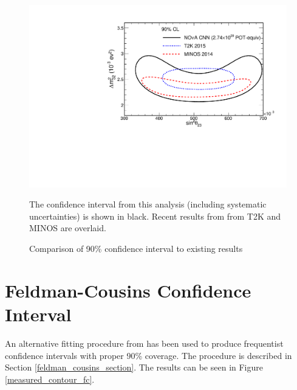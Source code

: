 \begin{figure}
\begin{center}
\includegraphics[width=\textwidth]{figures/results/fd_extrap_contour_OverlayT2KMINOS.pdf}
\end{center}
\caption{Comparison of 90\% confidence interval to existing results}{
The confidence interval from this analysis (including systematic uncertainties)
is shown in black.
Recent results from from T2K \cite{abe2015measurements} and
MINOS \cite{adamson2014combined} are overlaid.
}
\label{measured_contour_comparison}

\end{figure}

\clearpage

\section{Feldman-Cousins Confidence Interval}

An alternative fitting procedure from
\cite{feldman1998unified,backhouse2015cafana}
has been used to produce frequentist confidence intervals
with proper 90\% coverage.
The procedure is described in Section \ref{feldman_cousins_section}.
The results can be seen in Figure \ref{measured_contour_fc}.


